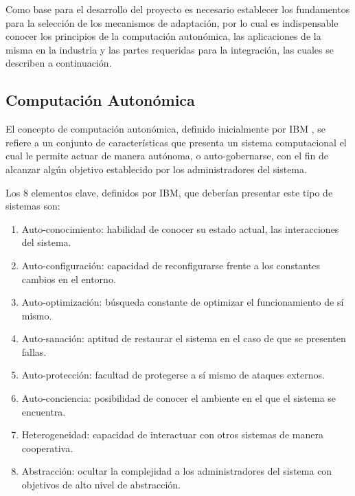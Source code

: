 \documentclass[12pt]{article}
\begin{document}
    Como base para el desarrollo del proyecto es necesario establecer los fundamentos para la selección de los mecanismos de adaptación, por lo cual es indispensable conocer los principios de la computación autonómica, las aplicaciones de la misma en la industria y las partes requeridas para la integración, las cuales se describen a continuación.

    \subsection{Computación Autonómica}
    

    El concepto de computación autonómica, definido inicialmente por IBM \citeyear{horn_2001}, se refiere a un conjunto de características que presenta un sistema computacional el cual le permite actuar de manera autónoma, o auto-gobernarse, con el fin de alcanzar algún objetivo establecido por los administradores del sistema.


    Los 8 elementos clave, definidos por IBM, que deberían presentar este tipo de sistemas son:
    \begin{enumerate}
        \item Auto-conocimiento: habilidad de conocer su estado actual, las interacciones del sistema.
        \item Auto-configuración: capacidad de reconfigurarse frente a los constantes cambios en el entorno.
        \item Auto-optimización: búsqueda constante de optimizar el funcionamiento de sí mismo.
        \item Auto-sanación: aptitud de restaurar el sistema en el caso de que se presenten fallas.
        \item Auto-protección: facultad de protegerse a sí mismo de ataques externos.
        \item Auto-conciencia: posibilidad de conocer el ambiente en el que el sistema se encuentra.
        \item Heterogeneidad: capacidad de interactuar con otros sistemas de manera cooperativa.
        \item Abstracción: ocultar la complejidad a los administradores del sistema con objetivos de alto nivel de abstracción.
    \end{enumerate}
\end{document}
